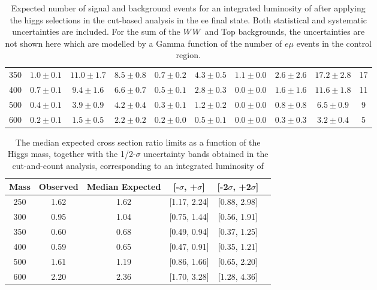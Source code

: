 \begin{table}[!ht]
{\begin{center}
\begin{tabular}{l | c c |  c c c c c c | c }
350 & $1.0\pm0.1$ & $11.0\pm1.7$ & $8.5\pm0.8$ & $0.7\pm0.2$ & $4.3\pm0.5$ & $1.1\pm0.0$ & $2.6\pm2.6$ & $17.2\pm2.8$ & 17 \\
400 & $0.7\pm0.1$ & $9.4\pm1.6$ & $6.6\pm0.7$ & $0.5\pm0.1$ & $2.8\pm0.3$ & $0.0\pm0.0$ & $1.6\pm1.6$ & $11.6\pm1.8$ & 11 \\
500 & $0.4\pm0.1$ & $3.9\pm0.9$ & $4.2\pm0.4$ & $0.3\pm0.1$ & $1.2\pm0.2$ & $0.0\pm0.0$ & $0.8\pm0.8$ & $6.5\pm0.9$ & 9 \\
600 & $0.2\pm0.1$ & $1.5\pm0.5$ & $2.2\pm0.2$ & $0.2\pm0.0$ & $0.5\pm0.1$ & $0.0\pm0.0$ & $0.3\pm0.3$ & $3.2\pm0.4$ & 5 \\
\hline\hline
\end{tabular}
\end{center}
}
\caption{Expected number of signal and background events for an integrated luminosity of \intlumi after applying the higgs selections 
  in the cut-based analysis in the ee final state. Both statistical and systematic uncertainties are included. For the sum of the $WW$ and Top backgrounds, the uncertainties are 
  not shown here which are modelled by a Gamma function of the number of $e\mu$ events in the control region.  }
\label{tab:yield_cutbased}
\end{table}

\begin{table}[!ht]
\begin{center}
\begin{tabular}{cccccc}
\hline\hline
Mass & Observed & Median Expected & [-$\sigma$, +$\sigma$] & [-2$\sigma$, +2$\sigma$]\\\hline
250 & 1.62 & 1.62 & [1.17, 2.24] & [0.88, 2.98] \\
300 & 0.95 & 1.04 & [0.75, 1.44] & [0.56, 1.91] \\
350 & 0.60 & 0.68 & [0.49, 0.94] & [0.37, 1.25] \\
400 & 0.59 & 0.65 & [0.47, 0.91] & [0.35, 1.21] \\
500 & 1.61 & 1.19 & [0.86, 1.66] & [0.65, 2.20] \\
600 & 2.20 & 2.36 & [1.70, 3.28] & [1.28, 4.36] \\
\hline\hline
\end{tabular}
\end{center}
\caption{The median expected cross section ratio limits as a function 
of the Higgs mass, together with the 1/2-$\sigma$ uncertainty bands obtained in the cut-and-count analysis, corresponding to 
an integrated luminosity of \intlumi}
\label{tab:limits_cutbased_5fb}
\end{table}

